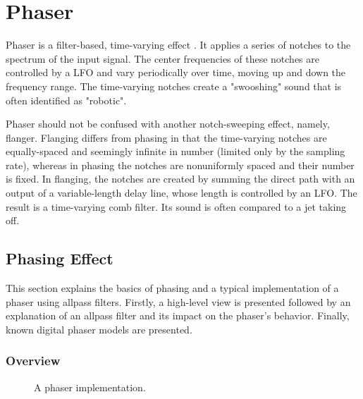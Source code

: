 
\chapter{Phaser}
\label{chap:phaser}
Phaser is a filter-based, time-varying effect \cite{Zoelzer2011}. It applies a series of notches to the spectrum of the input signal. The center frequencies of these notches are controlled by a \ac{LFO} and vary periodically over time, moving up and down the frequency range. The time-varying notches create a "swooshing" sound that is often identified as "robotic".

Phaser should not be confused with another notch-sweeping effect, namely, flanger. Flanging differs from phasing in that the time-varying notches are equally-spaced and seemingly infinite in number (limited only by the sampling rate), whereas in phasing the notches are nonuniformly spaced and their number is fixed. In flanging, the notches are created by summing the direct path with an output of a variable-length delay line, whose length is controlled by an \ac{LFO}. The result is a time-varying comb filter. Its sound is often compared to a jet taking off.


\section{Phasing Effect}
\label{sec:phasing_effect}

This section explains the basics of phasing and a typical implementation of a phaser using allpass filters. Firstly, a high-level view is presented followed by an explanation of an allpass filter and its impact on the phaser's behavior. Finally, known digital phaser models are presented.

\subsection{Overview}
\label{sec:phaser_overview}

\begin{figure}
    \centering
    
    \caption{A phaser implementation.}
    \label{fig:phaser}
\end{figure}

